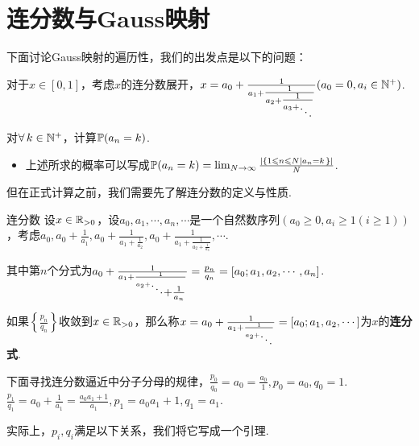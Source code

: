 \section{连分数与Gauss映射}
下面讨论Gauss映射的遍历性，我们的出发点是以下的问题：
\begin{problem}
    对于$x\in [0,1]$，考虑$x$的连分数展开，$x=a_0+\frac{1}{a_1+\tfrac{1}{a_2+\tfrac{1}{a_3+\raisebox{-.5\height}{$\ddots$}}}}(a_0=0,a_i\in\mb{N}^+)$.\par
    对$\forall\, k\in\mathbb{N}^+$，计算$\mathbb{P}(a_n=k)$.
    \begin{itemize}
        \item 上述所求的概率可以写成$\mathbb{P}(a_n=k)=\lim_{N\to\infty}{\frac{\left|\left\{1\leqslant n\leqslant N\left|a_n=k\right.\right\}\right|}{N}}$.
    \end{itemize}
    但在正式计算之前，我们需要先了解连分数的定义与性质.\par
    \begin{definition}{连分数}
        \wideline
        设$x\in\mathbb{R}_{>0}$，设$a_0,a_1,\cdots,a_n,\cdots$是一个自然数序列$(a_0\geq 0,a_i\geq 1(i\geq 1))$，考虑$a_0,a_0+\frac{1}{a_1},a_0+\frac{1}{a_1+\frac{1}{a_2}},a_0+\frac{1}{a_1+\frac{1}{a_2+\frac{1}{a_3}}},\cdots$.\par
        其中第$n$个分式为$a_0+\frac{1}{a_1+\frac{1}{a_2+\raisebox{-.5\height}{$\ddots$}\raisebox{-1\height}{$+\tfrac{1}{a_n}$}}}=\frac{p_n}{q_n}=[a_0;a_1,a_2,\cdots,a_n]$.\par
        如果$\left\{\frac{p_n}{q_n}\right\}$收敛到$x\in\mathbb{R}_{>0}$，那么称$x=a_0+\frac{1}{a_1+\frac{1}{a_2+\raisebox{-.5\height}{$\ddots$}}}=[a_0;a_1,a_2,\cdots]$为$x$的\textbf{连分式}.\par
    \end{definition}
    下面寻找连分数逼近中分子分母的规律，$\frac{p_0}{q_0}=a_0=\frac{a_0}{1},p_0=a_0,q_0=1$.$\frac{p_1}{q_1}=a_0+\frac{1}{a_1}=\frac{a_0a_1+1}{a_1},p_1=a_0a_1+1,q_1=a_1$.\par
    实际上，$p_i,q_i$满足以下关系，我们将它写成一个引理.
\end{problem}
